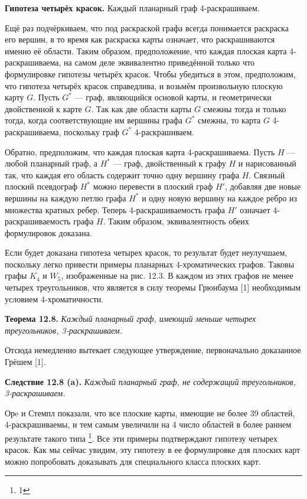 \textbf{Гипотеза четырёх красок.} Каждый планарный граф 4-раскрашиваем.

Ещё раз подчёркиваем, что под раскраской графа всегда понимается раскраска его вершин, в то время как раскраска карты означает, что раскрашиваются именно её области. Таким образом, предположение, что каждая плоская карта 4-раскрашиваема, на самом деле эквивалентно приведённой только что формулировке гипотезы четырёх красок. Чтобы убедиться в этом, предположим, что гипотеза четырёх красок справедлива, и возьмём произвольную плоскую карту \( G \). Пусть \( G^* \) — граф, являющийся основой карты, и геометрически двойственной к карте \( G \). Так как две области карты \( G \) смежны тогда и только тогда, когда соответствующие им вершины графа \( G^* \) смежны, то карта \( G \) 4-раскрашиваема, поскольку граф \( G^* \) 4-раскрашиваем.

Обратно, предположим, что каждая плоская карта 4-раскрашиваема. Пусть $H$ — любой планарный граф, а $H^*$ — граф, двойственный к графу $H$ и нарисованный так, что каждая его область содержит точно одну вершину графа $H$. Связный плоский псевдограф $H^*$ можно перевести в плоский граф $H'$, добавляя две новые вершины на каждую петлю графа $H^*$ и одну новую вершину на каждое ребро из множества кратных ребер. Теперь 4-раскрашиваемость графа $H'$ означает 4-раскрашиваемость графа $H$. Таким образом, эквивалентность обеих формулировок доказана.

Если будет доказана гипотеза четырех красок, то результат будет неулучшаем, поскольку легко привести примеры планарных 4-хроматических графов. Таковы графы $K_4$ и $W_5$, изображенные на рис. 12.3. В каждом из этих графов не менее четырех треугольников, что является в силу теоремы Грюнбаума [1] необходимым условием 4-хроматичности.

\textbf{Теорема 12.8.} \textit{Каждый планарный граф, имеющий меньше четырех треугольников, 3-раскрашиваем.}

Отсюда немедленно вытекает следующее утверждение, первоначально доказанное Грёшем [1].

\textbf{Следствие 12.8 (a).} \textit{Каждый планарный граф, не содержащий треугольников, 3-раскрашиваем.}

Орe и Стемпл \cite{1} показали, что все плоские карты, имеющие не более 39 областей, 4-раскрашиваемы, и тем самым увеличили на 4 число областей в более раннем результате такого типа \footnote{1}. Все эти примеры подтверждают гипотезу четырех красок. Как мы сейчас увидим, эту гипотезу в ее формулировке для плоских карт можно попробовать доказывать для специального класса плоских карт.

